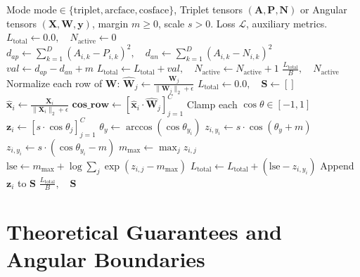 \documentclass[11pt]{article}
\begin{document}
\begin{algorithm}[H]
\caption{Unified Metric Learning Loss Forward Evaluation}
\label{alg:metric_learning}
\begin{algorithmic}[1]
\Require Mode $\mathrm{mode} \in \{\text{triplet}, \text{arcface}, \text{cosface}\}$, Triplet tensors $(\mathbf{A}, \mathbf{P}, \mathbf{N})$ or Angular tensors $(\mathbf{X}, \mathbf{W}, \mathbf{y})$, margin $m \ge 0$, scale $s > 0$.
\Ensure Loss $\mathcal{L}$, auxiliary metrics.
    \State $L_{\mathrm{total}} \gets 0.0, \quad N_{\mathrm{active}} \gets 0$
        \State $d_{ap} \gets \sum_{k=1}^D (A_{i, k} - P_{i, k})^2, \quad d_{an} \gets \sum_{k=1}^D (A_{i, k} - N_{i, k})^2$
        \State $val \gets d_{ap} - d_{an} + m$
            \State $L_{\mathrm{total}} \gets L_{\mathrm{total}} + val, \quad N_{\mathrm{active}} \gets N_{\mathrm{active}} + 1$
        \EndIf
    \EndFor
    \State \Return $\frac{L_{\mathrm{total}}}{B}, \quad N_{\mathrm{active}}$
\Else
    \State Normalize each row of $\mathbf{W}$: $\hat{\mathbf{W}}_j \gets \frac{\mathbf{W}_j}{\|\mathbf{W}_j\|_2 + \epsilon}$
    \State $L_{\mathrm{total}} \gets 0.0, \quad \mathbf{S} \gets []$
        \State $\hat{\mathbf{x}}_i \gets \frac{\mathbf{X}_i}{\|\mathbf{X}_i\|_2 + \epsilon}$
        \State $\mathbf{cos\_row} \gets [\hat{\mathbf{x}}_i \cdot \hat{\mathbf{W}}_j]_{j=1}^C$
        \State Clamp each $\cos\theta \in [-1, 1]$
        \State $\mathbf{z}_i \gets [s \cdot \cos\theta_j]_{j=1}^C$
            \State $\theta_y \gets \arccos(\cos\theta_{y_i})$
            \State $z_{i, y_i} \gets s \cdot \cos(\theta_y + m)$
        \Else
            \State $z_{i, y_i} \gets s \cdot (\cos\theta_{y_i} - m)$
        \EndIf
        \State $m_{\mathrm{max}} \gets \max_j z_{i, j}$
        \State $\mathrm{lse} \gets m_{\mathrm{max}} + \log\sum_j \exp(z_{i, j} - m_{\mathrm{max}})$
        \State $L_{\mathrm{total}} \gets L_{\mathrm{total}} + (\mathrm{lse} - z_{i, y_i})$
        \State Append $\mathbf{z}_i$ to $\mathbf{S}$
    \EndFor
    \State \Return $\frac{L_{\mathrm{total}}}{B}, \quad \mathbf{S}$
\EndIf
\end{algorithmic}
\end{algorithm}

\section{Theoretical Guarantees and Angular Boundaries}
\label{sec:guarantees}
\end{document}
